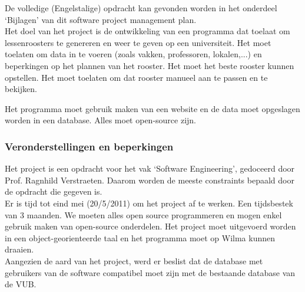 \documentclass{article}
\begin{document}



De volledige (Engelstalige) opdracht kan gevonden worden in het onderdeel `Bijlagen' van dit software project management plan.\\[3mm]

Het doel van het project is de ontwikkeling van een programma dat toelaat om lessenroosters te genereren en weer te geven op een universiteit. Het moet toelaten om data in te voeren (zoals vakken, professoren, lokalen,...) en beperkingen op het plannen van het rooster. Het moet het beste rooster kunnen opstellen. Het moet toelaten om dat rooster manueel aan te passen en te bekijken.

Het programma moet gebruik maken van een website en de data moet opgeslagen worden in een database. Alles moet open-source zijn.


\subsubsection{Veronderstellingen en beperkingen}


Het project is een opdracht voor het vak `Software Engineering', gedoceerd door Prof. Ragnhild Verstraeten. Daarom worden de meeste constraints bepaald door de opdracht die gegeven is. \\
Er is tijd tot eind mei (20/5/2011) om het project af te werken. Een tijdsbestek van 3 maanden. We moeten alles open source programmeren en mogen enkel gebruik maken van open-source onderdelen. Het project moet uitgevoerd worden in een object-georienteerde taal en het programma moet op Wilma kunnen draaien.\\
Aangezien de aard van het project, werd er beslist dat de database met gebruikers van de software compatibel moet zijn met de bestaande database van de VUB.
\end{document}
